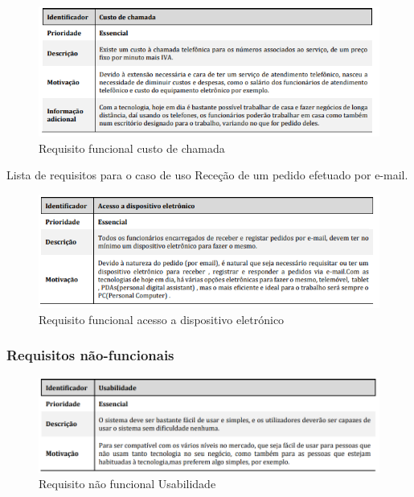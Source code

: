 \begin{figure}[H]
	\centering
	\includegraphics[width=15cm]{requisitofuncional7}
	\caption{Requisito funcional custo de chamada}
	\label{fig:requisitofuncional7}
\end{figure}

Lista de requisitos para o caso de uso Receção de um pedido efetuado por e-mail.\\

\begin{figure}[H]
	\centering
	\includegraphics[width=15cm]{requisitofuncional8}
	\caption{Requisito funcional acesso a dispositivo eletrónico}
	\label{fig:requisitofuncional8}
\end{figure}

\subsubsection{Requisitos não-funcionais}

\begin{figure}[H]
	\centering
	\includegraphics[width=15cm]{requisito_nao_funcional1}
	\caption{Requisito não funcional Usabilidade}
	\label{fig:requisitonaofuncional1}
\end{figure}

